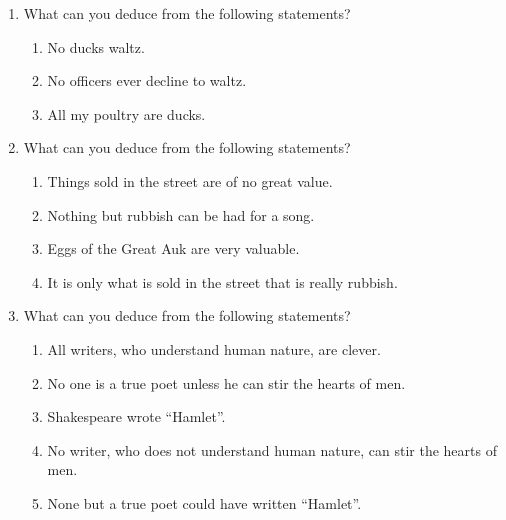 \begin{enumerate}
\item What can you deduce from the following statements?
\begin{enumerate}
\item No ducks waltz.
\item No officers ever decline to waltz.
\item All my poultry are ducks.
\end{enumerate}




\item What can you deduce from the following statements?
\begin{enumerate}
\item Things sold in the street are of no great value.
\item Nothing but rubbish can be had for a song.
\item Eggs of the Great Auk are very valuable.
\item It is only what is sold in the street that is really rubbish.

\end{enumerate}
\item What can you deduce from the following statements?
\begin{enumerate}
\item All writers, who understand human nature, are clever.
\item No one is a true poet unless he can stir the hearts of men.
\item Shakespeare wrote ``Hamlet''.
\item No writer, who does not understand human nature, can stir the hearts of men.
\item None but a true poet could have written ``Hamlet''.

\end{enumerate}

\end{enumerate}
